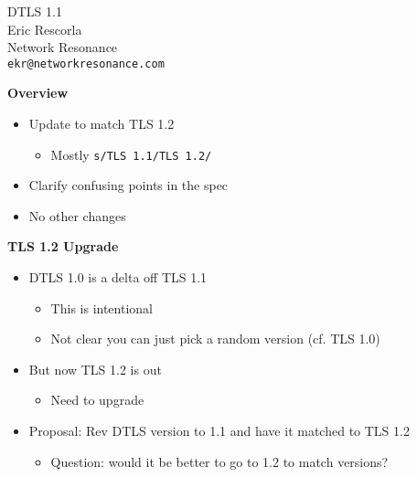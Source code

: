 \documentclass[helvetica]{seminar}
\newcommand{\heading}[1]{%
  \begin{center} 
    \large\bf 
    #1 
  \end{center} 
  \vspace{.4 in}}
\begin{document}
        
\begin{slide}
\begin{center}
\LARGE{{\bf}DTLS 1.1}\\

\vspace{.3 in}
\large{Eric Rescorla}\\
\large{Network Resonance}\\
\large{\texttt{ekr@networkresonance.com}}

\end{center}
\end{slide}

\begin{slide}
\heading{Overview}

\begin{itemize}
\item Update to match TLS 1.2 
\begin{itemize}
\item Mostly \verb^s/TLS 1.1/TLS 1.2/^
\end{itemize}
\item Clarify confusing points in the spec
\item No other changes
\end{itemize}
\end{slide}


\begin{slide}
\heading{TLS 1.2 Upgrade}

\begin{itemize}
\item DTLS 1.0 is a delta off TLS 1.1
\begin{itemize}
\item This is intentional
\item Not clear you can just pick a random version (cf. TLS 1.0)
\end{itemize}
\item But now TLS 1.2 is out
\begin{itemize}
\item Need to upgrade
\end{itemize}
\item Proposal: Rev DTLS version to 1.1 and have it matched to TLS 1.2
\begin{itemize}
\item Question: would it be better to go to 1.2 to match versions?
\end{itemize}
\end{itemize}
\end{slide}
\end{document}

